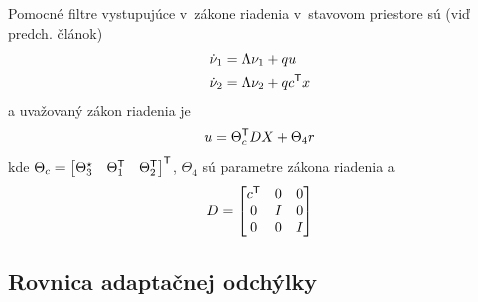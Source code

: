 ﻿\documentclass[a4paper, 10pt, ]{article}
\begin{document}
Pomocné filtre vystupujúce v~zákone riadenia v~stavovom priestore sú (viď predch. článok)
\begin{subequations} \label{vvMRAC_pomFiltre}
	\begin{align}
		\dot \nu_1 &= \Lambda \nu_1 + q u \\
		\dot \nu_2 &= \Lambda \nu_2 + q c^{\mathsf{T}} x
	\end{align}
\end{subequations}
a uvažovaný zákon riadenia je
\begin{equation}	\label{vvMRAC_uvZakRiad}
	u = \Theta_c^{\mathsf{T}} D X + \Theta_4 r
\end{equation}
kde $ \Theta_c = \begin{bmatrix} \Theta_3^\star  & \Theta_1^{\mathsf{T}} & \Theta_2^{\mathsf{T}} \end{bmatrix}^{\mathsf{T}}$, $\Theta_4$
sú parametre zákona riadenia a
\begin{align*}
	D = \begin{bmatrix}
			c^{\mathsf{T}} & 0 & 0 \\
			0 & I & 0 \\
			0 & 0 & I
	\end{bmatrix}
\end{align*}









\subsection{Rovnica adaptačnej odchýlky}
\end{document}
